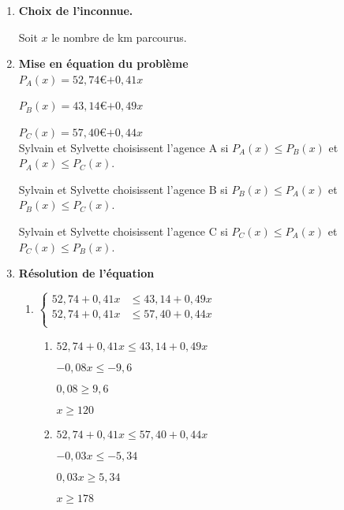 \begin{enumerate}


\item \textbf{Choix de l'inconnue.}

Soit $x$ le nombre de km parcourus. \\

\item \textbf{ Mise en équation du problème} \\

$P_A(x) = 52,74$\euro $+0,41x$ 

$P_B(x) = 43,14$\euro $+0,49x$ 

$P_C(x) = 57,40$\euro $+0,44x$ \\

Sylvain et Sylvette choisissent l'agence A si $P_A(x) \leqslant P_B(x)$ et $ P_A(x) \leqslant P_C(x)$. 

Sylvain et Sylvette choisissent l'agence B si $P_B(x) \leqslant P_A(x)$ et $ P_B(x) \leqslant P_C(x)$. 

Sylvain et Sylvette choisissent l'agence C si $P_C(x) \leqslant P_A(x)$ et $ P_C(x) \leqslant P_B(x)$. \\

\item \textbf{Résolution de l'équation} \\

\begin{enumerate}


\item {$\begin{cases}
52,74+0,41x &\leqslant 43,14+0,49x\\
52,74+0,41x & \leqslant 57,40+0,44x\\
\end{cases}$}

\begin{enumerate}


\item $52,74+0,41x \leqslant 43,14+0,49x$ 

$ -0,08x \leqslant -9,6 $

$ 0,08 \geqslant 9,6 $

$ x \geqslant 120 $ \\

\item $52,74+0,41x \leqslant 57,40+0,44x$

$-0,03x \leqslant -5,34$ 

$ 0,03x \geqslant  5,34 $

$ x \geqslant 178 $ \\



\end{enumerate}
\end{enumerate}
\end{enumerate}
